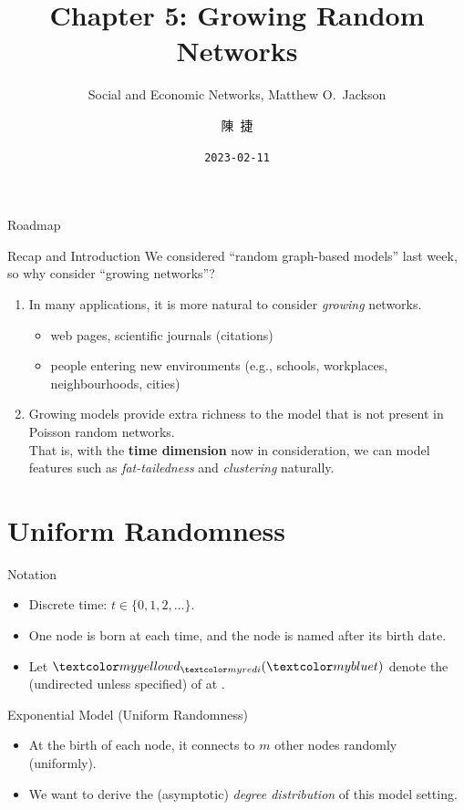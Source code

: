 \documentclass{beamer}
\title{Chapter 5: Growing Random Networks}
\subtitle{Social and Economic Networks, Matthew O.\ Jackson}
\author{陳\ 捷}
\date{\texttt{2023-02-11}}
\begin{document}
\begin{frame}{}
	\maketitle
\end{frame}

\begin{frame}{Roadmap}
	\tableofcontents
\end{frame}

\begin{frame}{Recap and Introduction}
	We considered ``random graph-based models'' last week,
	so why consider ``growing networks''?
	\begin{enumerate}
		\item
			In many applications, it is more natural to consider \emph{growing} networks.
			\begin{itemize}
				\item web pages, scientific journals (citations)
				\item people entering new environments (e.g., schools, workplaces, neighbourhoods, cities)
			\end{itemize}
		\item
			Growing models provide extra richness to the model that is not present in Poisson random networks. \\
			That is, with the \textbf{time dimension} now in consideration,
			we can model features such as \emph{fat-tailedness} and \emph{clustering} naturally.
	\end{enumerate}
\end{frame}

\section{Uniform Randomness}

\begin{frame}{Notation}
	\begin{itemize}
		\item
			Discrete time: $t\in\{0,1,2,...\}$.
		\item
			One node is born at each time, and the node is named after its birth date.
		\item
			Let $\yellow{d}_{\red{i}}(\blue{t})$ denote the  (undirected unless specified) of  at .
	\end{itemize}
\end{frame}

\begin{frame}{Exponential Model (Uniform Randomness)}
	\begin{itemize}
		\item
			At the birth of each node,
			it connects to $m$ other nodes randomly (uniformly).
		\item
			We want to derive the (asymptotic) \emph{degree distribution} of this model setting.
	\end{itemize}
\end{frame}
\end{document}
